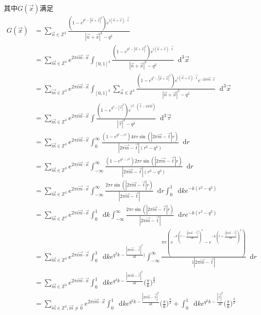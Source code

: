 \documentclass[UTF8]{ctexart}
\newcommand*{\dif}{\mathop{}\!\mathrm{d}}
\begin{document}
其中$G(\vec{x})$满足
\begin{equation}\label{4-c-2}
    \begin{aligned}
        G(\vec{x})&=\sum_{\vec{n}\in\mathbb{Z}^3}\frac{(1-e^{q^2-|\vec{n}+\vec{x}|^2})e^{\mathrm{i}(\vec{n}+\vec{x})\cdot\vec{t}}}{|\vec{n}+\vec{x}|^2-q^2}\\
        &=\sum_{\vec{m}\in\mathbb{Z}^3}e^{2\pi i\vec{m}\cdot\vec{x}}\int_{[0,1]^3}\frac{(1-e^{q^2-|\vec{n}+\vec{x}|^2})e^{\mathrm{i}(\vec{n}+\vec{x})\cdot\vec{t}}}{|\vec{n}+\vec{x}|^2-q^2}\dif^3\vec{x}\\
        &=\sum_{\vec{m}\in\mathbb{Z}^3}e^{2\pi i\vec{m}\cdot\vec{x}}\int_{[0,1]^3}\sum_{\vec{n}\in\mathbb{Z}^3}\frac{(1-e^{q^2-|\vec{n}+\vec{x}|^2})e^{\mathrm{i}(\vec{n}+\vec{x})\cdot\vec{t}}e^{-2\mathrm{i}\pi\vec{m}\cdot\vec{x}}}{|\vec{n}+\vec{x}|^2-q^2}\dif^3\vec{x}\\
        &=\sum_{\vec{m}\in\mathbb{Z}^3}e^{2\pi i\vec{m}\cdot\vec{x}}\int\frac{(1-e^{q^2-|\vec{\tau}|^2})e^{\mathrm{i}\vec{\tau}\cdot(\vec{t}-2\pi\vec{m})}}{|\vec{\tau}|^2-q^2}\dif^3\vec{\tau}\\
        &=\sum_{\vec{m}\in\mathbb{Z}^3}e^{2\pi i\vec{m}\cdot\vec{x}}\int_0^\infty\frac{(1-e^{q^2-r^2})4\pi r\sin(|2\pi\vec{m}-\vec{t}|r)}{|2\pi\vec{m}-\vec{t}|(r^2-q^2)}\dif r\\
        &=\sum_{\vec{m}\in\mathbb{Z}^3}e^{2\pi i\vec{m}\cdot\vec{x}}\int_{-\infty}^\infty\frac{(1-e^{q^2-r^2})2\pi r\sin(|2\pi\vec{m}-\vec{t}|r)}{|2\pi\vec{m}-\vec{t}|(r^2-q^2)}\dif r\\
        &=\sum_{\vec{m}\in\mathbb{Z}^3}e^{2\pi i\vec{m}\cdot\vec{x}}\int_{-\infty}^\infty \frac{2\pi r\sin(|2\pi\vec{m}-\vec{t}|r)}{|2\pi\vec{m}-\vec{t}|}\dif r\int_0^1\dif k e^{-k(r^2-q^2)}\\
        &=\sum_{\vec{m}\in\mathbb{Z}^3}e^{2\pi i\vec{m}\cdot\vec{x}}\int_0^1\dif k \int_{-\infty}^\infty \frac{2\pi r\sin(|2\pi\vec{m}-\vec{t}|r)}{|2\pi\vec{m}-\vec{t}|}\dif re^{-k(r^2-q^2)}\\
        &=\sum_{\vec{m}\in\mathbb{Z}^3}e^{2\pi i\vec{m}\cdot\vec{x}}\int_0^1\dif k e^{q^2k-\frac{|2\pi\vec{m}-\vec{t}|^2}{4k})}\int_{-\infty}^\infty \frac{\pi r(e^{-k(r-\frac{\mathrm{i}|2\pi\vec{m}-\vec{t}|}{2k})^2}-e^{-k(r+\frac{\mathrm{i}|2\pi\vec{m}-\vec{t}|}{2k})^2})}{\mathrm{i}|2\pi\vec{m}-\vec{t}|}\dif r\\
        &=\sum_{\vec{m}\in\mathbb{Z}^3}e^{2\pi i\vec{m}\cdot\vec{x}}\int_0^1\dif k e^{q^2k-\frac{|2\pi\vec{m}-\vec{t}|^2}{4k}}\Big(\frac{\pi}{k}\Big)^\frac{3}{2}\\
        &=\sum_{\vec{m}\in\mathbb{Z}^3,\vec{m}\neq\vec{0}}e^{2\pi i\vec{m}\cdot\vec{x}}\int_0^1\dif k e^{q^2k-\frac{|2\pi\vec{m}-\vec{t}|^2}{4k}}\Big(\frac{\pi}{k}\Big)^\frac{3}{2}+\int_0^1\dif k e^{q^2k-\frac{|\vec{t}|^2}{4k}}\Big(\frac{\pi}{k}\Big)^\frac{3}{2}
    \end{aligned}
\end{equation}
\end{document}
